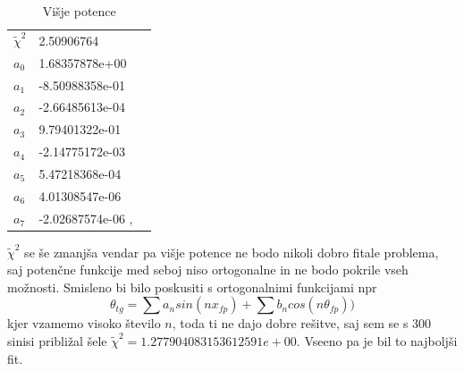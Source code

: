 \documentclass[11pt, a4paper]{article}
\begin{document}
\begin{table}[H]
\centering
\caption{Višje potence}
\label{my-label}
\begin{tabular}{lll}
   
     
	$\widetilde{\chi}^2$ &2.50906764
&  \\
 $a_0$ &  1.68357878e+00\\
 $a_1$ &   -8.50988358e-01    \\
 $a_2$ &  -2.66485613e-04   \\
 $a_3$ &    9.79401322e-01 \\
 $a_4$ & -2.14775172e-03 \\
 $a_5$ &  5.47218368e-04   \\
 $a_6$ & 4.01308547e-06  \\ 
 $a_7$ &  -2.02687574e-06 ,
\end{tabular}
\end{table}
$\widetilde{\chi}^2$  se še zmanjša vendar pa višje potence ne bodo nikoli dobro fitale problema, saj potenčne funkcije med seboj niso ortogonalne in ne bodo pokrile vseh možnosti. Smisleno bi bilo poskusiti s ortogonalnimi funkcijami 
npr
\begin{equation}
\theta_{tg} = \sum a_n sin(nx_{fp})+ \sum b_n cos(n\theta_{fp}))
\end{equation}
 kjer vzamemo visoko število $n$, toda ti ne dajo dobre rešitve, saj sem se s 300 sinisi približal šele $\widetilde{\chi}^2 = 1.277904083153612591e+00$. Vseeno pa je bil to najboljši fit.\newline
\end{document}
